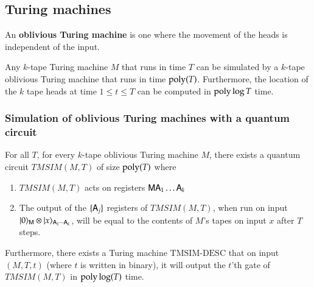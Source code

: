 \subsection{Turing machines}
\label{sec:turing_machines}


An \textbf{oblivious Turing machine} is one where the movement of the heads is independent of the input.

\begin{theorem}\label{thm:pippenger}
Any $k$-tape Turing machine $M$ that runs in time $T$ can be simulated by a $k$-tape oblivious Turing machine that runs in time $\operatorname{poly}(T)$. Furthermore, the location of the $k$ tape heads at time $1 \leq t \leq T$ can be computed in $\operatorname{poly} \log T$ time.
\end{theorem}


\subsubsection{Simulation of oblivious Turing machines with a quantum circuit}

\begin{lemma}\label{lem:tmsim}
	For all $T$, for every $k$-tape oblivious Turing machine $M$, there exists a quantum circuit $TMSIM(M,T)$ of size $\operatorname{poly}(T)$ where
	\begin{enumerate}
		\item $TMSIM(M,T)$ acts on registers ${\mathsf{M}} {\mathsf{A}}_1 \ldots {\mathsf{A}}_k$
		\item The output of the $\{{\mathsf{A}}_j\}$ registers of $TMSIM(M,T)$, when run on input $|0\rangle_{{\mathsf{M}}} \otimes |x\rangle_{{\mathsf{A}}_1 \cdots {\mathsf{A}}_k}$, will be equal to the contents of $M$'s tapes on input $x$ after $T$ steps.
	\end{enumerate}
	Furthermore, there exists a Turing machine $\text{TMSIM-DESC}$ that on input $(M,T,t)$ (where $t$ is written in binary), it will output the $t$'th gate of $TMSIM(M,T)$ in $\operatorname{poly}\log(T)$ time. 
\end{lemma}

